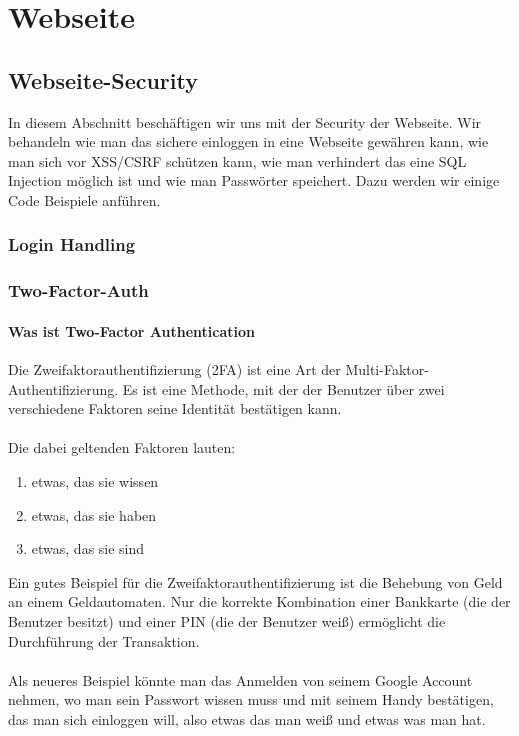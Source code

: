
\chapter{Webseite}
\label{sec:Webseite}
\section{Webseite-Security}
\label{sec:Security}
In diesem Abschnitt beschäftigen wir uns mit der Security der Webseite.
Wir behandeln wie man das sichere einloggen in eine Webseite gewähren kann, 
wie man sich vor XSS/CSRF schützen kann, wie man verhindert das eine SQL Injection
möglich ist und wie man Passwörter speichert. Dazu werden wir einige Code Beispiele anführen.

\subsection{Login Handling}
\label{sec:Login}
\subsection{Two-Factor-Auth}
\label{sec:tfa}
\subsubsection{Was ist Two-Factor Authentication}
Die Zweifaktorauthentifizierung (2FA) ist eine Art der Multi-Faktor-Authentifizierung. Es ist eine Methode, mit der der Benutzer über zwei verschiedene Faktoren seine Identität bestätigen kann.\\ \\
Die dabei geltenden Faktoren lauten:
\begin{enumerate}
\item etwas, das sie wissen
\item etwas, das sie haben
\item etwas, das sie sind
\end{enumerate}
Ein gutes Beispiel für die Zweifaktorauthentifizierung ist die Behebung von Geld an einem Geldautomaten. Nur die korrekte Kombination einer Bankkarte (die der Benutzer besitzt) und einer PIN (die der Benutzer weiß) ermöglicht die Durchführung der Transaktion.\\ \\Als neueres Beispiel könnte man das Anmelden von seinem Google Account nehmen, wo man sein Passwort wissen muss und mit seinem Handy bestätigen, das man sich einloggen will, also etwas das man weiß und etwas was man hat. 


